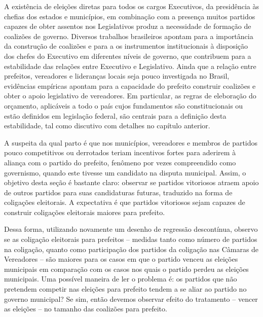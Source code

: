 A existência de eleições diretas para todos os cargos Executivos, da presidência às chefias dos estados e municípios, em combinação com a presença muitos partidos capazes de obter assentos nos Legislativos produz a necessidade de formação de coalizões de governo. Diversos trabalhos brasileiros apontam para a importância da construção de coalizões e para a os instrumentos institucionais à disposição dos chefes do Executivo em diferentes níveis de governo, que contribuem para a estabilidade das relações entre Executivo e Legislativo. Ainda que a relação entre prefeitos, vereadores e lideranças locais seja pouco investigada no Brasil, evidências empíricas apontam para a capacidade do prefeito construir coalizões e obter o apoio legislativo de vereadores. Em particular, as regras de eleboração do orçamento, aplicáveis a todo o país cujos fundamentos são constitucionais ou estão definidos em legislação federal, são centrais para a definição desta estabilidade, tal como discutivo com detalhes no capítulo anterior.

A suspeita da qual parto é que nos municípios, vereadores e membros de partidos pouco competitivos ou derrotados teriam incentivos fortes para aderirem à aliança com o partido do prefeito, fenômeno por vezes compreendido como governismo, quando este tivesse um candidato na disputa municipal. Assim, o objetivo desta seção é bastante claro: observar se partidos vitoriosos atraem apoio de outros partidos para suas candidaturas futuras, traduzido na forma de coligações eleitorais. A expectativa é que partidos vitoriosos sejam capazes de construir coligações eleitorais maiores para prefeito.

Dessa forma, utilizando novamente um desenho de regressão descontínua, observo se as coligação eleitorais para prefeitos -- medidas tanto como número de partidos na coligação, quanto como participação dos partidos da coligação nas Câmaras de Vereadores -- são maiores para os casos em que o partido venceu as eleições municipais em comparação com os casos nos quais o partido perdeu as eleições municipais. Uma possível maneira de ler o problema é: os partidos que não pretendem competir nas eleições para prefeito tendem a se aliar ao partido no governo municipal? Se sim, então devemos observar efeito do tratamento -- vencer as eleições -- no tamanho das coalizões para prefeito.

